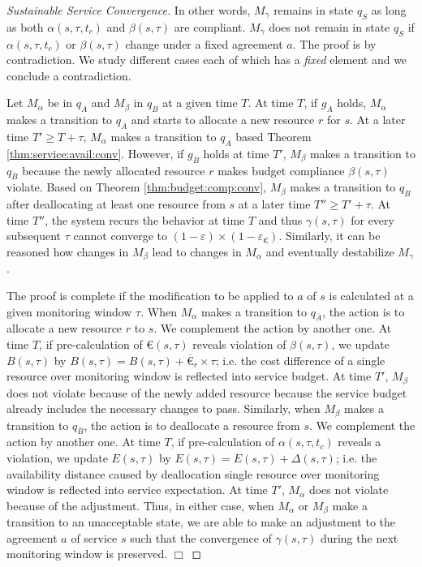 \begin{proof}[Sustainable Service Convergence]
In other words, $M_\gamma$ remains in state $q_S$ as long as both $\alpha(s,\tau,t_c)$ and $\beta(s,\tau)$ are compliant.
$M_\gamma$ does not remain in state $q_S$ if $\alpha(s,\tau,t_c)$ or $\beta(s,\tau)$ change under a fixed agreement $a$.
The proof is by contradiction.
We study different cases each of which has a \emph{fixed} element and we conclude a contradiction. 

Let $M_\alpha$ be in $q_A$ and $M_\beta$ in $q_B$ at a given time $T$.
At time $T$, if $g_{\overline{A}}$ holds, $M_\alpha$ makes a transition to $q_{\overline{A}}$ and starts to allocate a new resource $r$ for $s$.
At a later time $T' \geq T + \tau$, $M_\alpha$ makes a transition to $q_A$ based Theorem \ref{thm:service:avail:conv}.
However, if $g_{\overline{B}}$ holds at time $T'$, $M_\beta$ makes a transition to $q_{\overline{B}}$ because the newly allocated resource $r$ makes budget compliance $\beta(s,\tau)$ violate.
Based on Theorem \ref{thm:budget:comp:conv}, $M_\beta$ makes a transition to $q_B$ after deallocating at least one resource from $s$ at a later time $T'' \geq T' + \tau$.
At time $T''$, the system recurs the behavior at time $T$ and thus $\gamma(s,\tau)$ for every subsequent $\tau$ cannot converge to $(1-\varepsilon)\times(1-\varepsilon_{\euro})$.
Similarly, it can be reasoned how changes in $M_\beta$ lead to changes in $M_\alpha$ and eventually destabilize $M_\gamma$.

The proof is complete if the modification to be applied to $a$ of $s$ is calculated at a given monitoring window $\tau$.
When $M_\alpha$ makes a transition to $q_{\overline{A}}$, the action is to allocate a new resource $r$ to $s$.
We complement the action by another one.
At time $T$, if pre-calculation of $\euro(s,\tau)$ reveals violation of $\beta(s,\tau)$, we update $B(s,\tau)$ by $B(s,\tau) = B(s,\tau) + \overline{\euro}_r \times \tau$; i.e. the cost difference of a single resource over monitoring window is reflected into service budget.
At time $T'$, $M_\beta$ does not violate because of the newly added resource because the service budget already includes the necessary changes to pass.
Similarly, when $M_\beta$ makes a transition to $q_{\overline{B}}$, the action is to deallocate a resource from $s$.
We complement the action by another one.
At time $T$, if pre-calculation of $\alpha(s,\tau,t_c)$ reveals a violation, we update $E(s,\tau)$ by $E(s,\tau) = E(s,\tau) + \Delta(s,\tau)$; i.e. the availability distance caused by deallocation single resource over monitoring window is reflected into service expectation.
At time $T'$, $M_\alpha$ does not violate because of the adjustment. 
Thus, in either case, when $M_\alpha$ or $M_\beta$ make a transition to an unacceptable state, we are able to make an adjustment to the agreement $a$ of service $s$ such that the convergence of $\gamma(s,\tau)$ during the next monitoring window is preserved. 
\newline
$\Box$
\end{proof}

